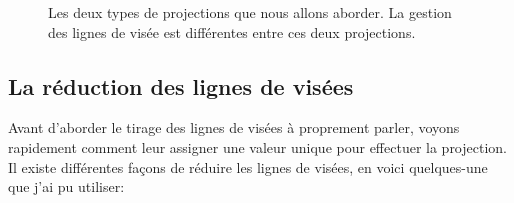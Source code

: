 \begin{figure}
    \center
    \qquad
    \caption[Deux types de projections]{Les deux types de projections que nous allons aborder.
    La gestion des lignes de visée est différentes entre ces deux projections.}
 	\label{fig:raycast_projection}
\end{figure}

\subsection{La réduction des lignes de visées}

Avant d'aborder le tirage des lignes de visées à proprement parler, voyons rapidement comment leur assigner une valeur unique pour effectuer la projection.
Il existe différentes façons de réduire les lignes de visées, en voici quelques-une que j'ai pu utiliser:

